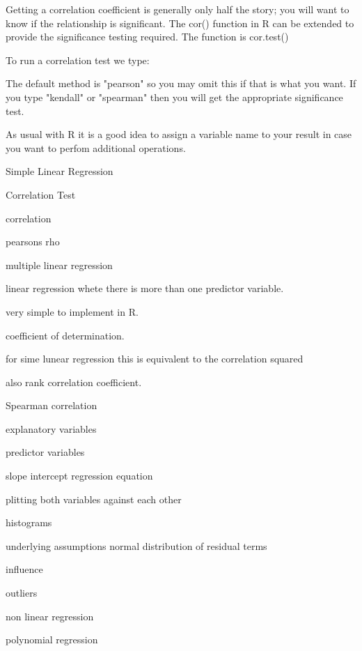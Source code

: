 Getting a correlation coefficient is generally only half the story; you will want to know if the relationship is significant. The cor() function in R can be extended to provide the significance testing required. The function is cor.test()


To run a correlation test we type:

The default method is "pearson" so you may omit this if that is what you want. If you type "kendall" or "spearman" then you will get the appropriate significance test.

As usual with R it is a good idea to assign a variable name to your result in case you want to perfom additional operations.

Simple Linear Regression

Correlation Test

correlation

pearsons rho



 multiple linear regression


linear regression whete there is more than one predictor variable.

very simple to implement in R.


coefficient of determination. 

for sime lunear regression this is equivalent to the correlation squared


also rank correlation coefficient.

Spearman correlation




explanatory variables

predictor variables

slope intercept regression  equation

plitting both variables against each other

histograms 


underlying assumptions normal distribution of residual terms

influence

outliers

 non linear regression

 polynomial regression

